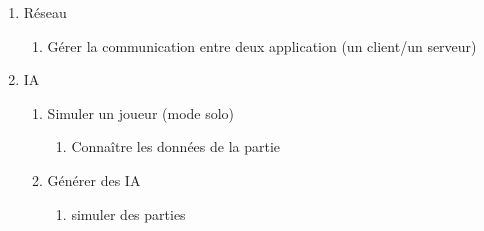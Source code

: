 \documentclass{article}
\begin{document}
\begin{enumerate}
\begin{enumerate}
\begin{enumerate}
   \end{enumerate}
  \end{enumerate}
  \item Réseau
  \begin{enumerate}
   \item Gérer la communication entre deux application (un client/un serveur)
  \end{enumerate}
  \item IA
  \begin{enumerate}
    \item Simuler un joueur (mode solo)
    \begin{enumerate}
     \item Connaître les données de la partie 
    \end{enumerate}
    \item Générer des IA
    \begin{enumerate}
      \item simuler des parties
    \end{enumerate}
   \end{enumerate}
\end{enumerate}


\subsection{}
\end{document}
